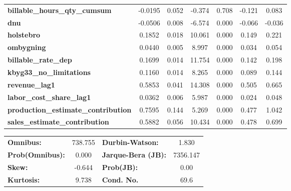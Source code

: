 \begin{center}
\begin{tabular}{lcccccc}
\textbf{billable\_hours\_qty\_cumsum}       &      -0.0195  &        0.052     &    -0.374  &         0.708        &       -0.121    &        0.083     \\
\textbf{dnu}                                &      -0.0506  &        0.008     &    -6.574  &         0.000        &       -0.066    &       -0.036     \\
\textbf{holstebro}                          &       0.1852  &        0.018     &    10.061  &         0.000        &        0.149    &        0.221     \\
\textbf{ombygning}                          &       0.0440  &        0.005     &     8.997  &         0.000        &        0.034    &        0.054     \\
\textbf{billable\_rate\_dep}                &       0.1699  &        0.014     &    11.754  &         0.000        &        0.142    &        0.198     \\
\textbf{kbyg33\_no\_limitations}            &       0.1160  &        0.014     &     8.265  &         0.000        &        0.089    &        0.144     \\
\textbf{revenue\_lag1}                      &       0.5853  &        0.041     &    14.308  &         0.000        &        0.505    &        0.665     \\
\textbf{labor\_cost\_share\_lag1}           &       0.0362  &        0.006     &     5.987  &         0.000        &        0.024    &        0.048     \\
\textbf{production\_estimate\_contribution} &       0.7595  &        0.144     &     5.269  &         0.000        &        0.477    &        1.042     \\
\textbf{sales\_estimate\_contribution}      &       0.5882  &        0.056     &    10.434  &         0.000        &        0.478    &        0.699     \\
\bottomrule
\end{tabular}
\begin{tabular}{lclc}
\textbf{Omnibus:}       & 738.755 & \textbf{  Durbin-Watson:     } &    1.830  \\
\textbf{Prob(Omnibus):} &   0.000 & \textbf{  Jarque-Bera (JB):  } & 7356.147  \\
\textbf{Skew:}          &  -0.644 & \textbf{  Prob(JB):          } &     0.00  \\
\textbf{Kurtosis:}      &   9.738 & \textbf{  Cond. No.          } &     69.6  \\
\bottomrule
\end{tabular}
\end{center}